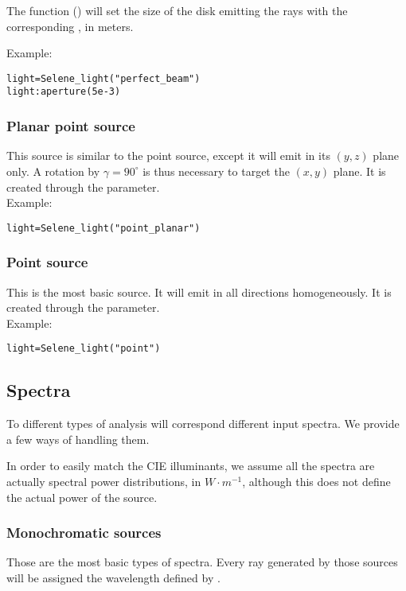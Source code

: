 The function () will set the size of the disk emitting the rays with the corresponding , in meters.

\noindent Example:
\begin{lstlisting}
light=Selene_light("perfect_beam")
light:aperture(5e-3)
\end{lstlisting}

\subsubsection{Planar point source}

This source is similar to the point source, except it will emit in its $(y,z)$ plane only. A rotation by $\gamma=90^\circ$ is thus necessary to target the $(x,y)$ plane. It is created through the  parameter.\\ Example:
\begin{lstlisting}
light=Selene_light("point_planar")
\end{lstlisting}

\subsubsection{Point source}

This is the most basic source. It will emit in all directions homogeneously. It is created through the  parameter.\\ Example:
\begin{lstlisting}
light=Selene_light("point")
\end{lstlisting}

\subsection{Spectra}

To different types of analysis will correspond different input spectra. We provide a few ways of handling them.

In order to easily match the CIE illuminants, we assume all the spectra are actually spectral power distributions, in $W\cdot m^{-1}$, although this does not define the actual power of the source.

\subsubsection{Monochromatic sources}

Those are the most basic types of spectra. Every ray generated by those sources will be assigned the wavelength defined by .

